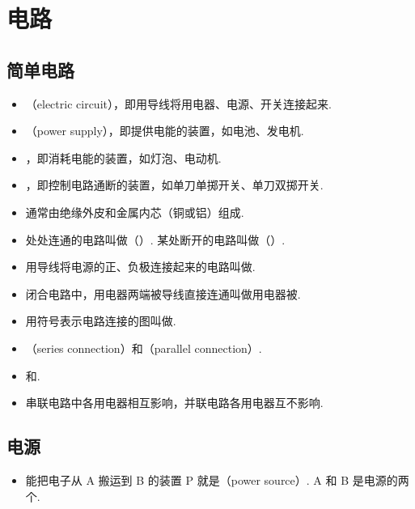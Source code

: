 \newpage
\section{电路}

\subsection{简单电路}
\vspace{10pt}
\begin{itemize}
\item {}（electric circuit），即用导线将用电器、电源、开关连接起来.
\item {}（power supply），即提供电能的装置，如电池、发电机.
\item {}，即消耗电能的装置，如灯泡、电动机.
\item {}，即控制电路通断的装置，如单刀单掷开关、单刀双掷开关.
\item {}通常由绝缘外皮和金属内芯（铜或铝）组成.
\item 处处连通的电路叫做（）. 某处断开的电路叫做（）.
\item {}用导线将电源的正、负极连接起来的电路叫做.
\item 闭合电路中，用电器两端被导线直接连通叫做用电器被.
\item 用符号表示电路连接的图叫做.
\item {}（series connection）和（parallel connection）.
\item {}和.
\item 串联电路中各用电器相互影响，并联电路各用电器互不影响.
\end{itemize}

\subsection{电源}
\vspace{10pt}
\begin{itemize}
\item 能把电子从 A 搬运到 B 的装置 P 就是（power source）. A 和 B 是电源的两个.
\end{itemize}

